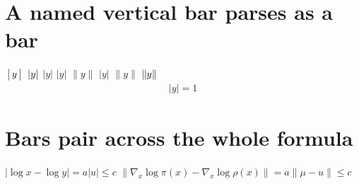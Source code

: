\documentclass{article}
\begin{document}
\section{A named vertical bar parses as a bar}
$\bigl\arrowvert y \bigr\arrowvert$ $\arrowvert y \arrowvert$ $\bigl\vert y \bigr\vert$ $\big\lvert y \big\rvert$ $\bigl\| y \bigr\|$ $\bigl\lvert y\bigr\rvert$ $\bigl\lVert y\bigr\rVert$ $\Arrowvert y\Arrowvert$
\[\begin{gathered}\bigl\lvert y\bigr\rvert=1\end{gathered}\]

\section{Bars pair across the whole formula}
$|\log x-\log y|=a|u|\leq c$ $\|\nabla_{x}\log\pi(x)-\nabla_{x}\log\rho(x)\|=a\|\mu-u\|\leq c$

\end{document}
